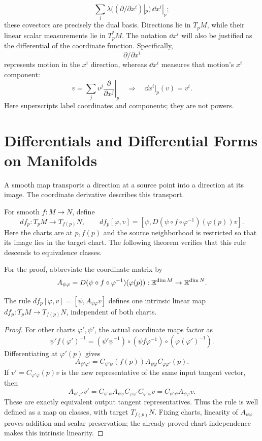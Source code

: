 \[
\sum_i\lambda((\partial/\partial x^i)|_p)\,\dd x^i|_p;
\]
 these covectors
are precisely the dual basis. Directions lie in $T_pM$, while their
linear scalar measurements lie in $T_p^*M$. The notation $\dd x^i$
will also be justified as the differential of the coordinate function.
Specifically,
\[
\partial/\partial x^i
\]
 represents motion in the $x^i$
direction, whereas $\dd x^i$ measures that motion's $x^i$ component:
\[
v=\sum_j v^j\left.\frac{\partial}{\partial x^j}\right|_p
\quad\Longrightarrow\quad \dd x^i|_p(v)=v^i.
\]
Here superscripts label coordinates and components; they are not powers.

\section{Differentials and Differential Forms on Manifolds}
\label{sec:manifold-differentials}
A smooth map transports a direction at a source point into a direction
at its image. The coordinate derivative describes this transport.
\begin{definition}
For smooth $f:M\to N$, define
\[
\boxed{df_p:T_pM\to T_{f(p)}N,\qquad
df_p[\varphi,v]=[\psi,D(\psi\circ f\circ\varphi^{-1})(\varphi(p))v].}
\]
Here the charts are at $p,f(p)$ and the source neighborhood is restricted
so that its image lies in the target chart. The following theorem verifies
that this rule descends to equivalence classes.
\end{definition}
For the proof, abbreviate the coordinate matrix by
\[
A_{\psi\varphi}=D(\psi\circ f\circ\varphi^{-1})(\varphi(p)):
\mathbb{R}^{\dim M}\to\mathbb{R}^{\dim N}.
\]
\begin{theorem}\label{thm:manifold-differential}
The rule $df_p[\varphi,v]=[\psi,A_{\psi\varphi}v]$ defines one intrinsic
linear map $df_p:T_pM\to T_{f(p)}N$, independent of both charts.
\end{theorem}
\begin{proof}
For other charts $\varphi',\psi'$, the actual coordinate maps factor as
\[
\psi'f(\varphi')^{-1}
=(\psi'\psi^{-1})\circ(\psi f\varphi^{-1})\circ(\varphi(\varphi')^{-1}).
\]
Differentiating at $\varphi'(p)$ gives
\[
A_{\psi'\varphi'}
=C_{\psi'\psi}(f(p))A_{\psi\varphi}C_{\varphi\varphi'}(p).
\]
If $v'=C_{\varphi'\varphi}(p)v$ is the new representative of the same
input tangent vector, then
\[
A_{\psi'\varphi'}v'
=C_{\psi'\psi}A_{\psi\varphi}C_{\varphi\varphi'}C_{\varphi'\varphi}v
=C_{\psi'\psi}A_{\psi\varphi}v.
\]
These are exactly equivalent output tangent representatives. Thus the rule
is well defined as a map on classes, with target $T_{f(p)}N$. Fixing charts,
linearity of $A_{\psi\varphi}$ proves addition and scalar preservation;
the already proved chart independence makes this intrinsic linearity.
\end{proof}
